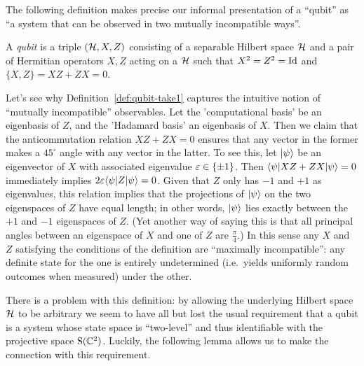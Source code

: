 The following definition makes precise our informal presentation of a ``qubit'' as ``a system that can be observed in two mutually incompatible ways''. 

\begin{definition}\label{def:qubit-take1}
A \emph{qubit} is a triple $(\mathcal{H},X,Z)$ consisting of a separable Hilbert space $\mathcal{H}$ and a pair of Hermitian operators $X,Z$ acting on a $\mathcal{H}$ such that $X^2=Z^2=\mathop{\rm Id}\nolimits$ and $\{X,Z\}=XZ+ZX=0$.
\end{definition}

Let's see why 
Definition~\ref{def:qubit-take1} captures the intuitive notion of ``mutually incompatible'' observables. Let the 'computational basis' be an eigenbasis of $Z$, and the 'Hadamard basis' an eigenbasis of $X$. Then we claim that the anticommutation relation $XZ+ZX=0$ ensures that any vector in the former makes a $45^{\circ}$ angle with any vector in the latter. To see this, let $|\psi\rangle$ be an eigenvector of $X$ with associated eigenvalue $\varepsilon\in\{\pm 1\}$. Then $\langle\psi| XZ + ZX |\psi\rangle = 0$ immediately implies $2\varepsilon\langle\psi| Z |\psi\rangle=0$. Given that $Z$ only has $-1$ and $+1$ as eigenvalues, this relation implies that the projections of $|\psi\rangle$ on the two eigenspaces of $Z$ have equal length; in other words, $|\psi\rangle$ lies exactly between the $+1$ and $-1$ eigenspaces of $Z$. (Yet another way of saying this is that all principal angles between an eigenspace of $X$ and one of $Z$ are $\frac{\pi}{4}$.) In this sense any $X$ and $Z$ satisfying the conditions of the definition are ``maximally incompatible'': any definite state for the one is entirely undetermined (i.e.\ yields uniformly random outcomes when measured) under the other. 

There is a problem with this definition: by allowing the underlying Hilbert space $\mathcal{H}$ to be arbitrary we seem to have all but lost the usual requirement that a qubit is a system whose state space is ``two-level'' and thus identifiable with the projective space $\mathrm{S}(\mathbb{C}^2)$. Luckily, the following lemma allows us to make the connection with this requirement. 

